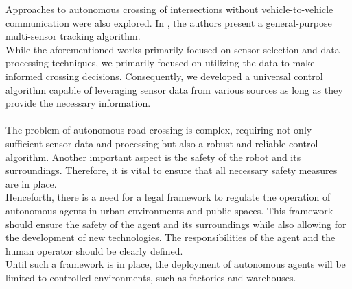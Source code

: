 Approaches to autonomous crossing of intersections without vehicle-to-vehicle communication were also explored. In \cite{CMMPHD}, the authors present a general-purpose multi-sensor tracking algorithm.\\
While the aforementioned works primarily focused on sensor selection and data processing techniques, we primarily focused on utilizing the data to make informed crossing decisions. Consequently, we developed a universal control algorithm capable of leveraging sensor data from various sources as long as they provide the necessary information.\\\\
The problem of autonomous road crossing is complex, requiring not only sufficient sensor data and processing but also a robust and reliable control algorithm. Another important aspect is the safety of the robot and its surroundings. Therefore, it is vital to ensure that all necessary safety measures are in place.\\
Henceforth, there is a need for a legal framework to regulate the operation of autonomous agents in urban environments and public spaces. This framework should ensure the safety of the agent and its surroundings while also allowing for the development of new technologies. The responsibilities of the agent and the human operator should be clearly defined.\\
Until such a framework is in place, the deployment of autonomous agents will be limited to controlled environments, such as factories and warehouses.
